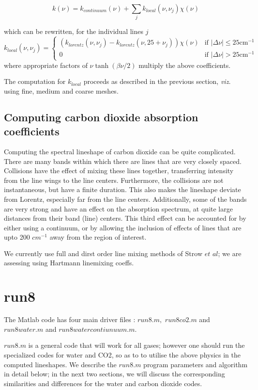 \documentclass[11pt]{article}
\begin{document}
\[
k(\nu) = k_{continuum}(\nu) + \sum_{j} k_{local}(\nu,\nu_{j}) \chi(\nu)
\]

which can be rewritten, for the individual lines $j$
\[
k_{local}(\nu,\nu_{j}) = 
\left\{
\begin{array}{cl}
     ( k_{lorentz}(\nu,\nu_{j}) - k_{lorentz}(\nu,25+\nu_{j}) ) 
           \chi(\nu)    & \mbox{if $|\Delta\nu| \leq 25 \mbox{cm}^{-1}$} \\
        0               & \mbox{if $|\Delta\nu| > 25 \mbox{cm}^{-1}$}
\end{array}
\right. 
\]
where appropriate factors of $\nu\tanh\left(\beta\nu/2\right)$ 
multiply the above coefficients. 

The computation for $k_{local}$ proceeds as described in the previous 
section, {\em viz.} using fine, medium and coarse meshes.

\subsection{Computing carbon dioxide absorption coefficients}

Computing the spectral lineshape of carbon dioxide can be quite complicated.
There are many bands within which there are lines that are very closely 
spaced. Collisions have the effect of mixing these lines together,
transferring intensity from the line wings to the line centers. Furthermore,
the  collisions are not instantaneous, but have a finite duration. This 
also makes the lineshape deviate from Lorentz, especially far from the line
centers. Additionally, some of the bands are very strong and have an 
effect on the absorption spectrum, at
quite large distances from their band (line) centers. This third effect can
be accounted for by either using a continuum, or by allowing the inclusion
of effects of lines that are upto 200 $cm^{-1}$ away from the region of 
interest.

We currently use full and dirst order line mixing methods of Strow $et$ $al$;
we are assessing using Hartmann linemixing coeffs.

\newpage
\section{run8}

The Matlab code has four main driver files : $run8.m,$ $run8co2.m$ and
$run8water.m$ and $run8watercontiunuum.m.$ 

$run8.m$ is a general code that will work for all gases; however 
one should run the specialized codes for water and CO2, so as to to utilise 
the above physics in the computed lineshapes. We describe the $run8.m$ 
program parameters and algorithm in detail below; in the next two sections, 
we will discuss the corresponding similarities and differences for the 
water and carbon dioxide codes.
\end{document}
